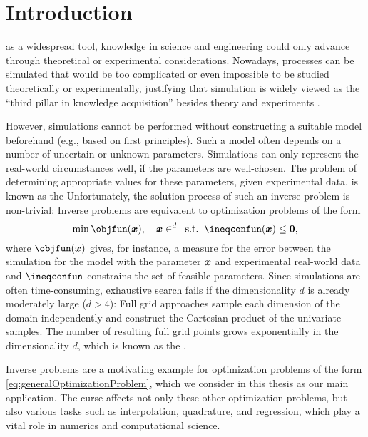 
\chapter{Introduction}
\label{chap:10introduction}

as a widespread tool,
knowledge in science and engineering could only advance through
theoretical or experimental considerations.
Nowadays, processes can be simulated
that would be too complicated or even impossible
to be studied theoretically or experimentally,
justifying that simulation is widely viewed as the
``third pillar in knowledge acquisition''
besides theory and experiments \cite{Bungartz14Modeling}.

However, simulations cannot be performed without constructing
a suitable model beforehand (e.g., based on first principles).
Such a model often depends on a number of uncertain or unknown parameters.
Simulations can only represent the real-world circumstances well,
if the parameters are well-chosen.
The problem of determining appropriate values for these parameters,
given experimental data, is known as the 
Unfortunately, the solution process of such an inverse problem is non-trivial:
Inverse problems are equivalent to optimization problems of the form
\begin{equation}
  \label{eq:generalOptimizationProblem}
  \min \objfun(\*x),\quad
  \*x \in \real^d\;\;\text{s.t.}\;\;
  \ineqconfun(\*x) \le \*0,
\end{equation}
where $\objfun(\*x)$ gives, for instance,
a measure for the error between the simulation for the model with
the parameter ${\boldsymbol{x}}$ and experimental real-world data and
$\ineqconfun$ constrains the set of feasible parameters.
Since simulations are often time-consuming,
exhaustive search fails
if the dimensionality $d$ is already moderately large ($d > 4$):
Full grid approaches sample each dimension of the domain
independently and construct the Cartesian product of the univariate
samples.
The number of resulting full grid points
grows exponentially in the dimensionality $d$,
which is known as the  \cite{Bellman61Adaptive}.

Inverse problems are a motivating example for optimization problems
of the form \eqref{eq:generalOptimizationProblem}, which we consider in
this thesis as our main application.
The curse affects not only these other optimization problems,
but also various tasks such as interpolation, quadrature, and regression,
which play a vital role in numerics and computational science.

